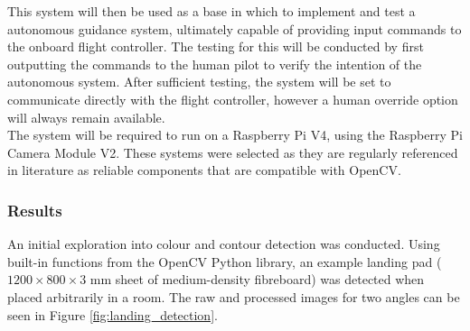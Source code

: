 

This system will then be used as a base in which to implement and test a autonomous guidance system, ultimately capable of providing input commands to the onboard flight controller. The testing for this will be conducted by first outputting the commands to the human pilot to verify the intention of the autonomous system. After sufficient testing, the system will be set to communicate directly with the flight controller, however a human override option will always remain available.\\

The system will be required to run on a Raspberry Pi V4, using the Raspberry Pi Camera Module V2. These systems were selected as they are regularly referenced in literature as reliable components that are compatible with OpenCV.



\subsubsection{Results}

An initial exploration into colour and contour detection was conducted. Using built-in functions from the OpenCV Python library, an example landing pad ($1200\times800\times3$ mm sheet of medium-density fibreboard) was detected when placed arbitrarily in a room. The raw and processed images for two angles can be seen in Figure \ref{fig:landing_detection}. 

